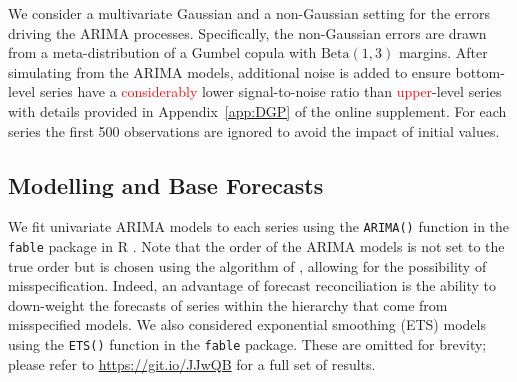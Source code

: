 \documentclass[a4paper,12pt]{article}
\theoremstyle{definition}
\begin{document}
We consider a multivariate Gaussian and a non-Gaussian setting for the errors driving the ARIMA processes. Specifically, the non-Gaussian errors are drawn from a meta-distribution of a Gumbel copula with $\text{Beta}(1,3)$ margins. After simulating from the ARIMA models, additional noise is added to ensure bottom-level series have a \textcolor{red}{considerably} lower signal-to-noise ratio than \textcolor{red}{upper}-level series with details provided in Appendix~\ref{app:DGP} of the online supplement. For each series the first 500 observations are ignored to avoid the impact of initial values.


\subsection{Modelling and Base Forecasts}

We fit univariate ARIMA models to each series using the \verb|ARIMA()| function in the \verb|fable| package \citep{Rfable} in R \citep{Rcore}. Note that the order of the ARIMA models is not set to the true order but is chosen using the algorithm of \cite{HynKha2008}, allowing for the possibility of misspecification. Indeed, an advantage of forecast reconciliation is the ability to down-weight the forecasts of series within the hierarchy that come from misspecified models. We also considered exponential smoothing (ETS) models using the \verb|ETS()| function in the \verb|fable| package. These are omitted for brevity; please refer to \url{https://git.io/JJwQB} for a full set of results.
\end{document}
